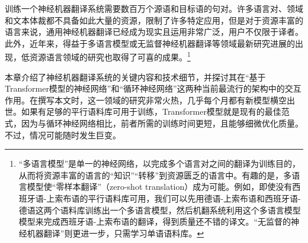 \documentclass[output=paper,colorlinks,citecolor=brown]{langscibook}
\begin{document}
训练一个神经机器翻译系统需要数百万个源语和目标语的句对。许多语言对、领域和文本体裁都不具备如此大量的资源，限制了许多特定应用，但是对于资源丰富的语言来说，通用神经机器翻译已经成为现实且运用非常广泛，用户不仅限于译者。此外，近年来，得益于多语言模型或无监督神经机器翻译等领域最新研究进展的出现，低资源语言领域的研究也取得了可喜的成果。\footnote{“多语言模型”是单一的神经网络，以完成多个语言对之间的翻译为训练目的，从而将资源丰富的语言的“知识”“转移”到资源匮乏的语言中。有趣的是，多语言模型使“零样本翻译”（zero-shot translation）\citep{zero2021}成为可能。例如，即使没有西班牙语-上索布语的平行语料库可用，我们可以先用德语-上索布语和西班牙语-德语这两个语料库训练出一个多语言模型，然后机翻系统利用这个多语言模型模型来完成西班牙语-上索布语的翻译，得到质量还不错的译文。“无监督的神经机器翻译”则更进一步，只需学习单语语料库。}

本章介绍了神经机器翻译系统的关键内容和技术细节，并探讨其在“基于Transformer模型的神经网络”和“循环神经网络”这两种当前最流行的架构中的交互作用。在撰写本文时，这一领域的研究非常火热，几乎每个月都有新模型横空出世。如果有足够的平行语料库可用于训练，Transformer模型就是现有的最佳范式，因为与循环神经网络相比，前者所需的训练时间更短，且能够细微优化质量。不过，情况可能随时发生巨变。



\sloppy
\printbibliography[heading=subbibliography,notkeyword=this]
\end{document}
